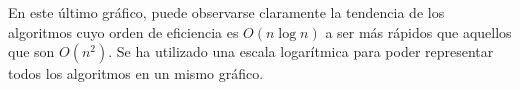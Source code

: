 \documentclass[11pt]{article}
\begin{document}
En este último gráfico, puede observarse claramente la tendencia de los algoritmos cuyo orden de eficiencia es $O(n\log n)$ a ser más rápidos que aquellos que son $O(n^2)$. Se ha utilizado una escala logarítmica para poder representar todos los algoritmos en un mismo gráfico.

\newpage





%	
\end{document}
